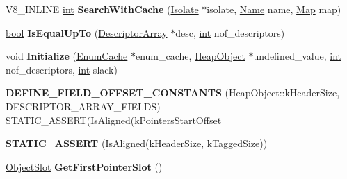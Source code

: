 \begin{DoxyCompactItemize}
\item 
\mbox{\label{classv8_1_1internal_1_1DescriptorArray_a653c10f17509a9cff572b4804834fc7a}} 
V8\+\_\+\+I\+N\+L\+I\+NE \mbox{\hyperlink{classint}{int}} {\bfseries Search\+With\+Cache} (\mbox{\hyperlink{classv8_1_1internal_1_1Isolate}{Isolate}} $\ast$isolate, \mbox{\hyperlink{classv8_1_1internal_1_1Name}{Name}} name, \mbox{\hyperlink{classv8_1_1internal_1_1Map}{Map}} map)
\item 
\mbox{\label{classv8_1_1internal_1_1DescriptorArray_a7874bd340f3d921469008c12b18e4e62}} 
\mbox{\hyperlink{classbool}{bool}} {\bfseries Is\+Equal\+Up\+To} (\mbox{\hyperlink{classv8_1_1internal_1_1DescriptorArray}{Descriptor\+Array}} $\ast$desc, \mbox{\hyperlink{classint}{int}} nof\+\_\+descriptors)
\item 
\mbox{\label{classv8_1_1internal_1_1DescriptorArray_a2e43235336eb34cfb7a4722bd42e5e01}} 
void {\bfseries Initialize} (\mbox{\hyperlink{classv8_1_1internal_1_1EnumCache}{Enum\+Cache}} $\ast$enum\+\_\+cache, \mbox{\hyperlink{classv8_1_1internal_1_1HeapObject}{Heap\+Object}} $\ast$undefined\+\_\+value, \mbox{\hyperlink{classint}{int}} nof\+\_\+descriptors, \mbox{\hyperlink{classint}{int}} slack)
\item 
\mbox{\label{classv8_1_1internal_1_1DescriptorArray_a9906d35fc4ad82ae6827bad6a20ff073}} 
{\bfseries D\+E\+F\+I\+N\+E\+\_\+\+F\+I\+E\+L\+D\+\_\+\+O\+F\+F\+S\+E\+T\+\_\+\+C\+O\+N\+S\+T\+A\+N\+TS} (Heap\+Object\+::k\+Header\+Size, D\+E\+S\+C\+R\+I\+P\+T\+O\+R\+\_\+\+A\+R\+R\+A\+Y\+\_\+\+F\+I\+E\+L\+DS) S\+T\+A\+T\+I\+C\+\_\+\+A\+S\+S\+E\+RT(Is\+Aligned(k\+Pointers\+Start\+Offset
\item 
\mbox{\label{classv8_1_1internal_1_1DescriptorArray_af2368e2c9db32d8f7e03b99b7e0bcb80}} 
{\bfseries S\+T\+A\+T\+I\+C\+\_\+\+A\+S\+S\+E\+RT} (Is\+Aligned(k\+Header\+Size, k\+Tagged\+Size))
\item 
\mbox{\label{classv8_1_1internal_1_1DescriptorArray_a3ae0ec5c462933ecbdab28dcd0f2dbd6}} 
\mbox{\hyperlink{classv8_1_1internal_1_1ObjectSlot}{Object\+Slot}} {\bfseries Get\+First\+Pointer\+Slot} ()

\end{DoxyCompactItemize}
